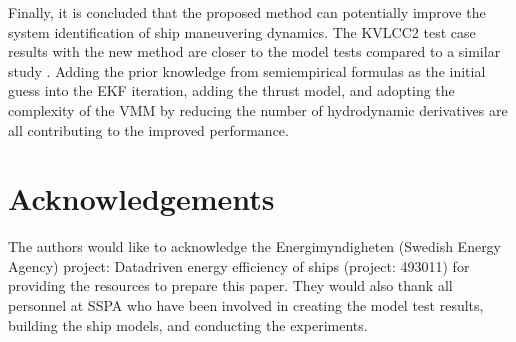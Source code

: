 \documentclass[review]{elsarticle}
\begin{document}
  
Finally, it is concluded that the proposed method can potentially improve the system identification of ship maneuvering dynamics. The KVLCC2 test case results with the new method are closer to the model tests compared to a similar study \cite{he_nonparametric_2022}. Adding the prior knowledge from semi\sphinxhyphen{}empirical formulas as the initial guess into the EKF iteration, adding the thrust model, and adopting the complexity of the VMM by reducing the number of hydrodynamic derivatives are all contributing to the improved performance.


\section{Acknowledgements}
\label{\detokenize{acknowledgements:acknowledgements}}\label{\detokenize{acknowledgements::doc}}
  
The authors would like to acknowledge the Energimyndigheten (Swedish Energy Agency) project: Data\sphinxhyphen{}driven energy efficiency of ships (project: 49301\sphinxhyphen{}1) for providing the resources to prepare this paper. They would also thank all personnel at SSPA who have been involved in creating the model test results, building the ship models, and conducting the experiments.
\label{\detokenize{bibligraphy:id1}}







\renewcommand{\indexname}{Index}


\end{document}
